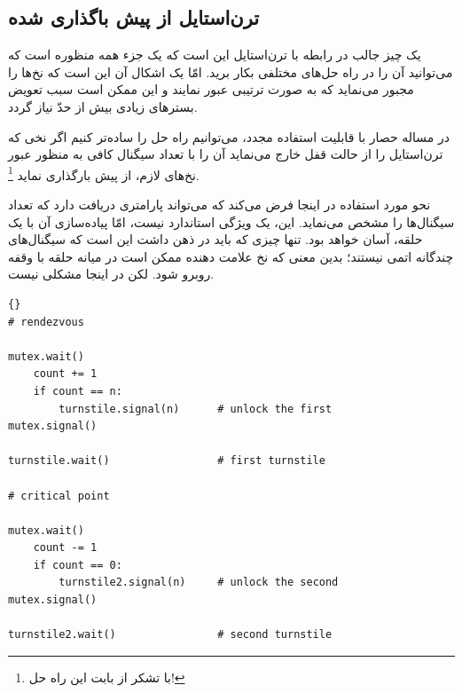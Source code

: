 \documentclass{book}
\begin{document}
\subsection { ترن‌استایل از پیش باگذاری شده}

    یک چیز جالب در رابطه با ترن‌استایل این است که یک جزء همه منظوره است که می‌توانید آن را در راه حل‌های مختلفی بکار برید. 
    امّا یک اشکال آن این است که نخ‌ها را مجبور می‌نماید که به صورت ترتیبی عبور نمایند و این ممکن است سبب 
    تعویض بسترهای زیادی بیش از حدّ نیاز گردد.

    در مساله حصار با قابلیت استفاده مجدد، می‌توانیم راه حل را ساده‌تر کنیم اگر نخی که ترن‌استایل را از حالت قفل خارج می‌نماید 
    آن را با تعداد سیگنال کافی به منظور عبور نخ‌های لازم، از پیش بارگذاری نماید \footnote{با تشکر از  بابت این راه حل!}. 

    نحو مورد استفاده در اینجا فرض می‌کند که  می‌تواند پارامتری دریافت دارد که تعداد سیگنال‌ها را مشخص می‌نماید. 
    این، یک ویژگی استاندارد نیست، امّا پیاده‌سازی آن با یک حلقه، آسان خواهد بود. تنها چیزی که باید در ذهن داشت این است که سیگنال‌های چندگانه 
    اتمی نیستند؛ بدین معنی که نخ علامت دهنده ممکن است در میانه حلقه با وقفه روبرو شود. لکن در اینجا مشکلی نیست.

\begin{latin}
\begin{latin}
\begin{lstlisting}[title=\rl{راه حل حصار با قابلیت استفاده مجدد}]{}
# rendezvous

mutex.wait()
    count += 1
    if count == n:
        turnstile.signal(n)      # unlock the first
mutex.signal()

turnstile.wait()                 # first turnstile

# critical point

mutex.wait()
    count -= 1
    if count == 0:
        turnstile2.signal(n)     # unlock the second
mutex.signal()

turnstile2.wait()                # second turnstile
\end{lstlisting}
\end{latin}
\end{latin}
\end{document}
